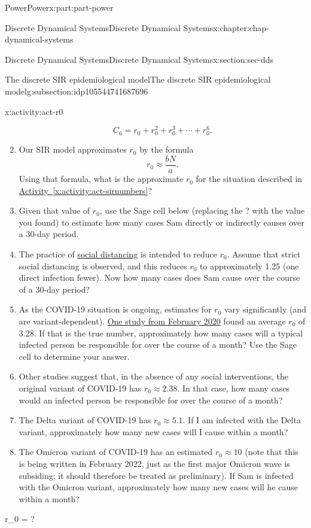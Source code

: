 \documentclass[oneside,10pt,]{book}
\newcommand{\xreffont}{\relax}
\numberwithin{equation}{section}
\begin{document}
\begin{partptx}{Power}{}{Power}{}{}{x:part:part-power}
\begin{chapterptx}{Discrete Dynamical Systems}{}{Discrete Dynamical Systems}{}{}{x:chapter:chap-dynamical-systems}
\begin{sectionptx}{Discrete Dynamical Systems}{}{Discrete Dynamical Systems}{}{}{x:section:sec-dds}
\begin{subsectionptx}{The discrete SIR epidemiological model}{}{The discrete SIR epidemiological model}{}{}{g:subsection:idp105544741687696}
\begin{activity}{}{x:activity:act-r0}
\begin{enumerate}
\begin{equation*}
C_6 = r_0 + r_0^2 + r_0^3 + \cdots + r_0^6.
\end{equation*}
%
\item{}Our SIR model approximates \(r_0\) by the formula%
\begin{equation}
r_0 \approx \frac{bN}{a}.\label{x:men:eq-r0}
\end{equation}
Using that formula, what is the approximate \(r_0\) for the situation described in \hyperref[x:activity:act-sirnumbers]{Activity~{\xreffont\ref{x:activity:act-sirnumbers}}}?%
\item{}Given that value of \(r_0\), use the Sage cell below (replacing the ? with the value you found) to estimate how many cases Sam directly or indirectly causes over a 30-day period.%
\item{}The practice of \href{https://en.wikipedia.org/wiki/Social_distancing}{social distancing}\footnotemark{} is intended to reduce \(r_0\). Assume that strict social distancing is observed, and this reduces \(r_0\) to approximately 1.25 (one direct infection fewer). Now how many cases does Sam cause over the course of a 30-day period?%
\item{}As the COVID-19 situation is ongoing, estimates for \(r_0\) vary significantly (and are variant-dependent). \href{https://academic.oup.com/jtm/article/27/2/taaa021/5735319}{One study from February 2020}\footnotemark{} found an average \(r_0\) of 3.28. If that is the true number, approximately how many cases will a typical infected person be responsible for over the course of a month? Use the Sage cell to determine your answer.%
\item{}Other studies suggest that, in the absence of any social interventions, the original variant of COVID-19 has \(r_0 \approx 2.38\). In that case, how many cases would an infected person be responsible for over the course of a month?%
\item{}The Delta variant of COVID-19 has \(r_0 \approx 5.1\). If I am infected with the Delta variant, approximately how many new cases will I cause within a month?%
\item{}The Omicron variant of COVID-19 has an estimated \(r_0 \approx 10\) (note that this is being written in February 2022, just as the first major Omicron wave is subsiding; it should therefore be treated as preliminary). If Sam is infected with the Omicron variant, approximately how many new cases will he cause within a month?%
\end{enumerate}
\begin{sageinput}
r_0 = ?

\end{sageinput}
\end{activity}
\end{subsectionptx}
\end{sectionptx}
\end{chapterptx}
\end{partptx}
\end{document}
